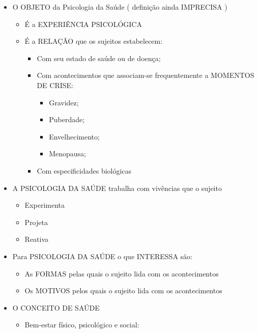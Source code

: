 \documentclass[
]{book}
\providecommand{\tightlist}{%
  \setlength{\itemsep}{0pt}\setlength{\parskip}{0pt}}
\begin{document}
\begin{itemize}
\tightlist
\item
  O OBJETO da Psicologia da Saúde ( definição ainda IMPRECISA )

  \begin{itemize}
  \tightlist
  \item
    É a EXPERIÊNCIA PSICOLÓGICA
  \item
    É a RELAÇÃO que os sujeitos estabelecem:

    \begin{itemize}
    \tightlist
    \item
      Com seu estado de saúde ou de doença;
    \item
      Com acontecimentos que associam-se frequentemente a MOMENTOS DE
      CRISE:

      \begin{itemize}
      \tightlist
      \item
        Gravidez;
      \item
        Puberdade;
      \item
        Envelhecimento;
      \item
        Menopausa;
      \end{itemize}
    \item
      Com especificidades biológicas
    \end{itemize}
  \end{itemize}
\item
  A PSICOLOGIA DA SAÚDE trabalha com vivências que o sujeito

  \begin{itemize}
  \tightlist
  \item
    Experimenta
  \item
    Projeta
  \item
    Reativa
  \end{itemize}
\item
  Para PSICOLOGIA DA SAÚDE o que INTERESSA são:

  \begin{itemize}
  \tightlist
  \item
    As FORMAS pelas quais o sujeito lida com os acontecimentos
  \item
    Os MOTIVOS pelos quais o sujeito lida com os acontecimentos
  \end{itemize}
\item
  O CONCEITO DE SAÚDE

  \begin{itemize}
  \tightlist
  \item
    Bem-estar físico, psicológico e social:


\end{itemize}
\end{itemize}
\end{document}
